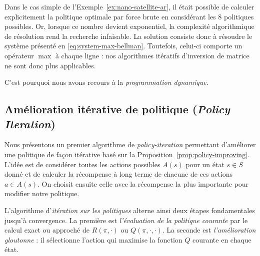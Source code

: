 Dans le cas simple de l'Exemple~\ref{ex:nano-satellite-ar}, il était possible de calculer explicitement la politique optimale par force brute en considérant les 8 politiques possibles. Or, lorsque ce nombre devient exponentiel, la complexité algorithmique de résolution rend la recherche infaisable. La solution consiste donc à résoudre le système présenté en \ref{eq:system-max-bellman}. Toutefois, celui-ci comporte un opérateur $\max$ à chaque ligne : nos algorithmes itératifs d'inversion de matrice ne sont donc plus applicables. 

C'est pourquoi nous avons recours à la \emph{programmation dynamique}. 

\subsection{Amélioration itérative de politique (\emph{Policy Iteration})}

Nous présentons un premier algorithme de \emph{policy-iteration} permettant d'améliorer une politique de façon itérative basé sur la Proposition~\ref{prop:policy-improving}. L'idée est de considérer toutes les actions possibles $A(s)$ pour un état $s \in S$ donné et de calculer la récompense à long terme de chacune de ces actions $a \in A(s)$. On choisit ensuite celle avec la récompense la plus importante pour modifier notre politique. 

L'algorithme d'\emph{itération sur les politiques} alterne ainsi deux étapes fondamentales jusqu'à convergence. La première est \emph{l'évaluation de la politique courante} par le calcul exact ou approché de $R(\pi, \cdot)$ ou $Q(\pi, \cdot, \cdot)$. La seconde est \emph{l'amélioration gloutonne} : il sélectionne l'action qui maximise la fonction $Q$ courante en chaque état. 

